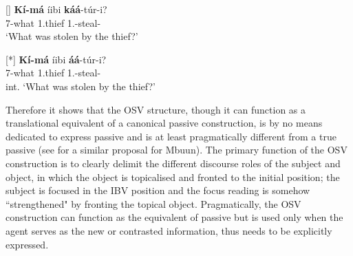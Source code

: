 \documentclass[output=paper,colorlinks,citecolor=brown,
]{langscibook}
\begin{document}
\begin{exe}
    \ex \label{123}
    \begin{xlist}
\ex
[]{
\label{123a}
\gll
\textbf{Kí-má} {\textltailm}íibi \textbf{káá}-túr-i?\\
7-what 1.thief 1\Sm{}.\Pst{}-steal-\Pst{}\\
\trans ‘What was stolen by the thief?’
}

\ex
[*]{
\label{123b}
\gll
\textbf{Kí-má} {\textltailm}íibi \textbf{áá}-túr-i?\\
7-what 1.thief 1\Sm{}.\Pst{}-steal-\Pst{}\\
\trans int. ‘What was stolen by the thief?’
}

    \end{xlist}
\end{exe}
Therefore it shows that the OSV structure, though it can function as a translational equivalent of a canonical passive construction, is by no means dedicated to express passive and is at least pragmatically different from a true passive (see \citealt{BostoenMundeke2011} for a similar proposal for Mbuun). The primary function of the OSV construction is to clearly delimit the different discourse roles of the subject and object, in which the object is topicalised and fronted to the initial position; the subject is focused in the IBV position and the focus reading is somehow ``strengthened" by fronting the topical object. Pragmatically, the OSV construction can function as the equivalent of passive but is used only when the agent serves as the new or contrasted information, thus needs to be explicitly expressed.
\end{document}
